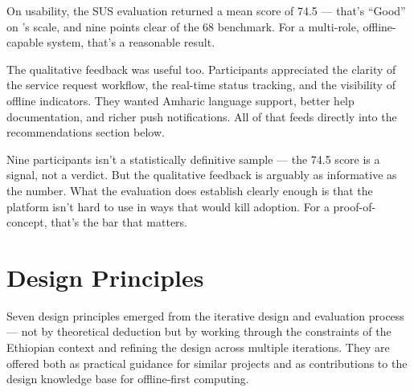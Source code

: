 On usability, the SUS evaluation returned a mean score of 74.5 --- that's ``Good'' on \citet{Bangor2009}'s scale, and nine points clear of the 68 benchmark. For a multi-role, offline-capable system, that's a reasonable result.

The qualitative feedback was useful too. Participants appreciated the clarity of the service request workflow, the real-time status tracking, and the visibility of offline indicators. They wanted Amharic language support, better help documentation, and richer push notifications. All of that feeds directly into the recommendations section below.

Nine participants isn't a statistically definitive sample --- the 74.5 score is a signal, not a verdict. But the qualitative feedback is arguably as informative as the number. What the evaluation does establish clearly enough is that the platform isn't hard to use in ways that would kill adoption. For a proof-of-concept, that's the bar that matters.

\section{Design Principles}

Seven design principles emerged from the iterative design and evaluation process --- not by theoretical deduction but by working through the constraints of the Ethiopian context and refining the design across multiple iterations. They are offered both as practical guidance for similar projects and as contributions to the design knowledge base for offline-first computing.

